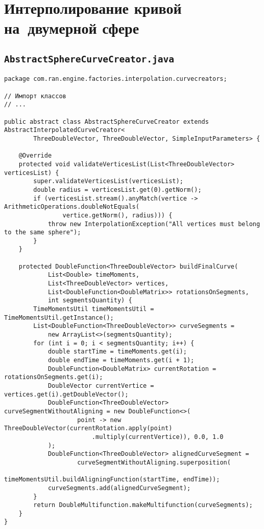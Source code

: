 \chapter{Интерполирование кривой на~двумерной сфере}

\section*{\texttt{AbstractSphereCurveCreator.java}}
\begin{verbatim}
package com.ran.engine.factories.interpolation.curvecreators;

// Импорт классов
// ...

public abstract class AbstractSphereCurveCreator extends AbstractInterpolatedCurveCreator<
        ThreeDoubleVector, ThreeDoubleVector, SimpleInputParameters> {

    @Override
    protected void validateVerticesList(List<ThreeDoubleVector> verticesList) {
        super.validateVerticesList(verticesList);
        double radius = verticesList.get(0).getNorm();
        if (verticesList.stream().anyMatch(vertice -> ArithmeticOperations.doubleNotEquals(
                vertice.getNorm(), radius))) {
            throw new InterpolationException("All vertices must belong to the same sphere");
        }
    }

    protected DoubleFunction<ThreeDoubleVector> buildFinalCurve(
            List<Double> timeMoments,
            List<ThreeDoubleVector> vertices,
            List<DoubleFunction<DoubleMatrix>> rotationsOnSegments,
            int segmentsQuantity) {
        TimeMomentsUtil timeMomentsUtil = TimeMomentsUtil.getInstance();
        List<DoubleFunction<ThreeDoubleVector>> curveSegments =
            new ArrayList<>(segmentsQuantity);
        for (int i = 0; i < segmentsQuantity; i++) {
            double startTime = timeMoments.get(i);
            double endTime = timeMoments.get(i + 1);
            DoubleFunction<DoubleMatrix> currentRotation = rotationsOnSegments.get(i);
            DoubleVector currentVertice = vertices.get(i).getDoubleVector();
            DoubleFunction<ThreeDoubleVector> curveSegmentWithoutAligning = new DoubleFunction<>(
                    point -> new ThreeDoubleVector(currentRotation.apply(point)
                        .multiply(currentVertice)), 0.0, 1.0
            );
            DoubleFunction<ThreeDoubleVector> alignedCurveSegment =
                    curveSegmentWithoutAligning.superposition(
                        timeMomentsUtil.buildAligningFunction(startTime, endTime));
            curveSegments.add(alignedCurveSegment);
        }
        return DoubleMultifunction.makeMultifunction(curveSegments);
    }
}
\end{verbatim}

